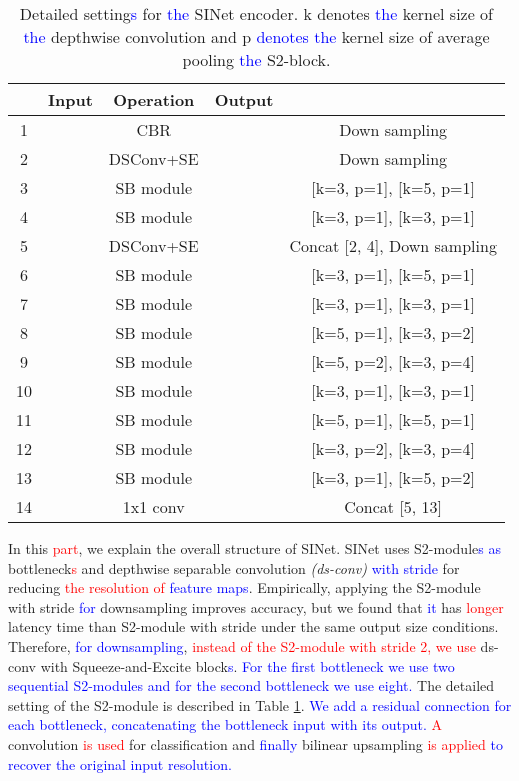 \documentclass[10pt,twocolumn,letterpaper]{article}
\newcommand\Lars[1]{\textcolor{blue}{#1}}
\newcommand\nj[1]{\textcolor{red}{#1}}
\newcommand\Lars[1]{#1}
\newcommand\nj[1]{#1}
\begin{document}
\begin{table}[t]
\tiny
  \begin{center}
      \begin{tabular}{c|c|c|c|c}
          & Input & Operation & Output &  \\
          \hline 
    1     &   & CBR    &    & Down sampling \\
    2     &   & DSConv+SE &   & Down sampling \\
    3     &   & SB module &   & [k=3, p=1], [k=5, p=1] \\
    4     & & SB module &  & [k=3, p=1], [k=3, p=1] \\
    5     &  & DSConv+SE &   & Concat [2, 4], Down sampling \\
    6     &   & SB module &   & [k=3, p=1], [k=5, p=1] \\
    7     &  & SB module &  & [k=3, p=1], [k=3, p=1] \\
    8     &  & SB module &  & [k=5, p=1], [k=3, p=2] \\
    9     &  & SB module &  & [k=5, p=2], [k=3, p=4] \\
    10    & & SB module &  & [k=3, p=1], [k=3, p=1] \\
    11    &  & SB module &  & [k=5, p=1], [k=5, p=1] \\
    12    &  & SB module &  & [k=3, p=2], [k=3, p=4] \\
    13    & & SB module &  & [k=3, p=1], [k=5, p=2] \\
    14    & & 1x1 conv &  & Concat [5, 13]\\
   
    \end{tabular}\end{center}
    \caption{Detailed setting\Lars{s} for \Lars{the} SINet encoder. k denotes \Lars{the} kernel size of \Lars{the} depthwise convolution and p \Lars{denotes the} kernel size of average pooling \Lars{the} S2-block. }
  \label{tab:setting}\vspace{-3mm}
\end{table}


In this \nj{part}, we explain the overall structure of SINet.
SINet uses S2-module\Lars{s} \Lars{as} bottleneck\nj{s} and depthwise separable convolution \textit{(ds-conv)} \Lars{with stride } for reducing \nj{the resolution of} \Lars{feature maps}.
Empirically, applying the S2-module with stride  \Lars{for} downsampling improves accuracy, but we found that \Lars{it} has \nj{longer} latency time than S2-module with stride   under the same output size conditions.
Therefore, \Lars{for downsampling}, \nj{instead of the S2-module with stride 2, we use} ds-conv with Squeeze-and-Excite block\Lars{s}.
\Lars{For the first bottleneck we use two sequential S2-modules and for the second bottleneck we use eight. }
The detailed setting of the S2-module is described in Table \ref{tab:setting}.
\Lars{We add a residual connection for each bottleneck, concatenating the bottleneck input with its output.}
\nj{A}  convolution \nj{is used} for classification and \Lars{finally} bilinear upsampling \nj{is applied} \Lars{to recover the original input resolution. }
\end{document}
